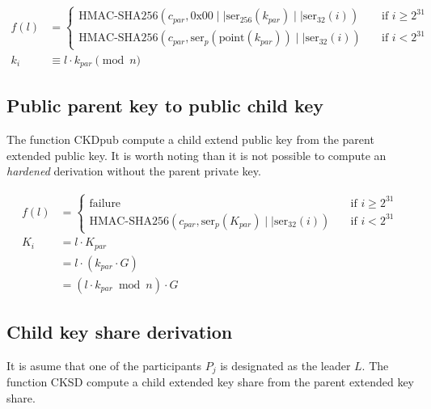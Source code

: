 \begin{equation*}
\begin{split}
  f(l) &=
  \begin{cases}
    \text{HMAC-SHA256}(c_{par}, \text{0x00}\mid\mid \text{ser}_{256}(k_{par})
    \mid\mid \text{ser}_{32}(i)) & \quad \text{if } i \geq 2^{31}\\
    \text{HMAC-SHA256}(c_{par}, \text{ser}_{p}(\text{point}(k_{par}))
    \mid\mid \text{ser}_{32}(i)) & \quad \text{if } i < 2^{31}
  \end{cases} \\
  k_i &\equiv l \cdot k_{par} \pmod n
\end{split}
\end{equation*}

\subsection{Public parent key to public child key}
The function CKDpub compute a child extend public key from the parent extended
public key. It is worth noting than it is not possible to compute an
\textit{hardened} derivation without the parent private key.

\begin{equation*}
\begin{split}
  f(l) &=
  \begin{cases}
    \text{failure} & \quad \text{if } i \geq 2^{31}\\
    \text{HMAC-SHA256}(c_{par}, \text{ser}_{p}(K_{par})
    \mid\mid \text{ser}_{32}(i)) & \quad \text{if } i < 2^{31}
  \end{cases} \\
  K_i &= l \cdot K_{par}\\
      &= l \cdot (k_{par} \cdot G)\\
      &= (l \cdot k_{par} \bmod n) \cdot G
\end{split}
\end{equation*}

\subsection{Child key share derivation}
It is asume that one of the participants $P_j$ is designated as the leader $L$.
The function CKSD compute a child extended key share from the parent
extended key share.

